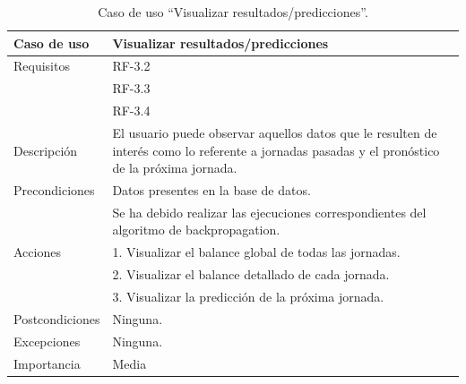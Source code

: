   \begin{table}
  \begin{center}
   \begin{tabular}{|p{3cm} | p{9cm} |}
    \hline
    Caso de uso & Visualizar resultados/predicciones\\
    \hline
    Requisitos & RF-3.2\\
    & RF-3.3\\
    & RF-3.4\\
    \hline
    Descripción & El usuario puede observar aquellos datos que le resulten de interés como lo referente a jornadas pasadas y el pronóstico de la próxima jornada.\\
    \hline
    Precondiciones &Datos presentes en la base de datos.\\
    			&Se ha debido realizar las ejecuciones correspondientes del algoritmo de backpropagation.\\
    \hline
  	Acciones & 1. Visualizar el balance global de todas las jornadas.\\
    &2. Visualizar el balance detallado de cada jornada.\\
    &3. Visualizar la predicción de la próxima jornada.\\
    \hline
    Postcondiciones & Ninguna. \\
    \hline
    Excepciones & Ninguna.\\
    \hline
    Importancia & Media\\
    \hline
   \end{tabular}
   \caption{Caso de uso ``Visualizar resultados/predicciones''.}
   \label{tabla:casoUso3.2}
  \end{center}
 \end{table}